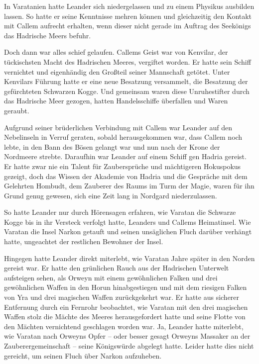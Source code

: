 In Varatanien hatte Leander sich niedergelassen und zu einem Physikus ausbilden lassen. So hatte er seine Kenntnisse mehren können und gleichzeitig den Kontakt mit Callem aufrecht erhalten, wenn dieser nicht gerade im Auftrag des Seekönigs das Hadrische Meers befuhr.

Doch dann war alles schief gelaufen. Callems Geist war von Kenvilar, der tückischsten Macht des Hadrischen Meeres, vergiftet worden. Er hatte sein Schiff vernichtet und eigenhändig den Großteil seiner Mannschaft getötet. Unter Kenvilars Führung hatte er eine neue Besatzung versammelt, die Besatzung der gefürchteten Schwarzen Kogge. Und gemeinsam waren diese Unruhestifter durch das Hadrische Meer gezogen, hatten Handelsschiffe überfallen und Waren geraubt.

Aufgrund seiner brüderlichen Verbindung mit Callem war Leander auf den Nebelinseln in Verruf geraten, sobald herausgekommen war, dass Callem noch lebte, in den Bann des Bösen gelangt war und nun nach der Krone der Nordmeere strebte. Daraufhin war Leander auf einem Schiff gen Hadria gereist. Er hatte zwar nie ein Talent für Zaubersprüche und mächtigeren Hokuspokus gezeigt, doch das Wissen der Akademie von Hadria und die Gespräche mit dem Gelehrten Hombudt, dem Zauberer des Raums im Turm der Magie, waren für ihn Grund genug gewesen, sich eine Zeit lang in Nordgard niederzulassen.

So hatte Leander nur durch Hörensagen erfahren, wie Varatan die Schwarze Kogge bis in ihr Versteck verfolgt hatte, Leanders und Callems Heimatinsel. Wie Varatan die Insel Narkon getauft und seinen unsäglichen Fluch darüber verhängt hatte, ungeachtet der restlichen Bewohner der Insel.

Hingegen hatte Leander direkt miterlebt, wie Varatan Jahre später in den Norden gereist war. Er hatte den grünlichen Rauch aus der Hadrischen Unterwelt aufsteigen sehen, als Orweyn mit einem gewöhnlichen Falken und drei gewöhnlichen Waffen in den Horun hinabgestiegen und mit dem riesigen Falken von Yra und drei magischen Waffen zurückgekehrt war. Er hatte aus sicherer Entfernung durch ein Fernrohr beobachtet, wie Varatan mit den drei magischen Waffen stolz die Mächte des Meeres herausgefordert hatte und seine Flotte von den Mächten vernichtend geschlagen worden war. Ja, Leander hatte miterlebt, wie Varatan nach Orweyns Opfer – oder besser gesagt Orweyns Massaker an der Zauberergemeinschaft – seine Königswürde abgelegt hatte. Leider hatte dies nicht gereicht, um seinen Fluch über Narkon aufzuheben.

